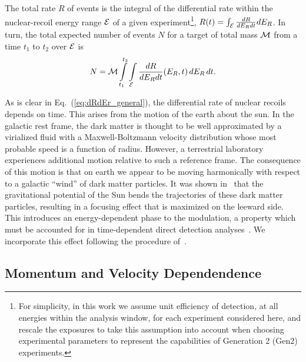 \documentclass[11pt]{article}
\newcommand{\beq}{\begin{equation}} \newcommand{\eeq}{\end{equation}}
\newcommand{\Eq}[1]{Eq.~(\ref{#1})} \newcommand{\Eqs}[2]{Eqs.~(\ref{#1}) and (\ref{#2})} \newcommand{\Eqm}[2]{Eqs.~(\ref{#1}) through (\ref{#2})}
\begin{document}
The total rate $R$ of events is the integral of the differential rate within the nuclear-recoil energy range ${\cal E}$ of a given experiment\footnote{For simplicity, in this work we assume unit efficiency of detection, at all energies within the analysis window, for each experiment considered here, and rescale the exposures to take this assumption into account when choosing experimental parameters to represent the capabilities of Generation 2 (Gen2) experiments.}, $R(t)=\int_{\cal E} \frac{dR}{dE_R dt} dE_R$. In turn, the total expected number of events $N$ for a target of total mass ${\cal M}$ from a time $t_1$ to $t_2$ over ${\cal E}$ is
\beq
N =  \cM \int\limits_{t_1}^{t_2} \int\limits_\cE  \frac{dR}{dE_R dt}(E_R,t)\,dE_R \,dt.
\eeq




As is clear in \Eq{eq:dRdEr_general}, the differential rate of nuclear recoils depends on time. This arises from the motion of the earth about the sun. In the galactic rest frame, the dark matter is thought to be well approximated by a virialized fluid with a Maxwell-Boltzmann velocity distribution whose most probable speed is a function of radius. However, a terrestrial laboratory experiences additional motion relative to such a reference frame. The consequence of this motion is that on earth we appear to be moving harmonically with respect to a galactic ``wind'' of dark matter particles. It was shown in~\cite{Danby01021957,Griest:1987vc,Sikivie:2002bj,Alenazi:2006wu} that the gravitational potential of the Sun bends the trajectories of these dark matter particles, resulting in a focusing effect that is maximized on the leeward side. This introduces an energy-dependent phase to the modulation, a property which must be accounted for in time-dependent direct detection analyses~\cite{Lee:2013wza,Bozorgnia:2014dqa,DelNobile:2015nua}. We incorporate this effect following the procedure of~\cite{Lee:2013wza}. 




\subsection{Momentum and Velocity Dependendence}
\end{document}
